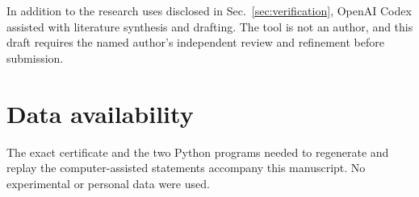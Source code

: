 \documentclass[aps,pra,reprint,groupedaddress,nofootinbib,longbibliography]{revtex4-2}
\begin{document}
\begin{acknowledgments}
In addition to the research uses disclosed in Sec.~\ref{sec:verification},
OpenAI Codex assisted with literature synthesis and drafting.  The tool is not an
author, and this draft requires the named author's independent review and
refinement before submission.
\end{acknowledgments}

\section*{Data availability}

The exact certificate and the two Python programs needed to regenerate and replay
the computer-assisted statements accompany this manuscript.  No experimental or
personal data were used.


\end{document}
